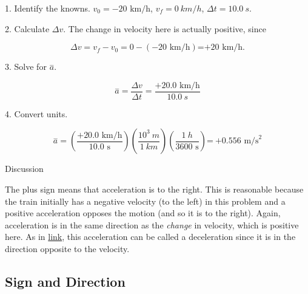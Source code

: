 \documentclass[
]{book}
\newenvironment{tinysection}{}{}
\begin{document}
1. Identify the knowns. \(v_{0} = {- \text{20\ km/h}}\),
\(v_{f} = 0\ km/h\), \({{\Delta t = \text{10}}\text{.}0\ s}{}\).

2. Calculate \({\Delta v}{}\). The change in velocity here is actually
positive, since

\leavevmode\hypertarget{import-auto-id2581122}{}%
\[{{{{\Delta v = {v_{f} - v_{0}}} = {0 - \left( {- \text{20\ km/h}} \right)}}\text{=}\text{+}\text{20\ km/h}}.}{}\]

3. Solve for \(\overset{-}{a}{}\).

\leavevmode\hypertarget{import-auto-id2585925}{}%
\[{\overset{-}{a} = \frac{\Delta v}{\Delta t}} = \frac{{+ \text{20}}\text{.0\ km/h}}{\text{10}\text{.}0\ s}\]

4. Convert units.

\leavevmode\hypertarget{import-auto-id2581171}{}%
\[{\overset{-}{a} = \left( \frac{{+ \text{20}}\text{.}\text{0\ km/h}}{\text{10}\text{.}\text{0\ s}} \right)}\left( \frac{\text{10}^{3}\ m}{1\ km} \right)\left( \frac{1\ h}{\text{3600\ s}} \right)\text{=}\ \text{+}0\text{.556\ m}\text{/s}^{2}\]

\begin{tinysection}

{Discussion}

\end{tinysection}

The plus sign means that acceleration is to the right. This is
reasonable because the train initially has a negative velocity (to the
left) in this problem and a positive acceleration opposes the motion
(and so it is to the right). Again, acceleration is in the same
direction as the \emph{change} in velocity, which is positive here. As in
\protect\hyperlink{fs-id3600466}{link}, this acceleration can be
called a deceleration since it is in the direction opposite to the
velocity.

\hypertarget{fs-id1810991}{}
\hypertarget{sign-and-direction}{%
\subsection{Sign and Direction}\label{sign-and-direction}}
\end{document}
